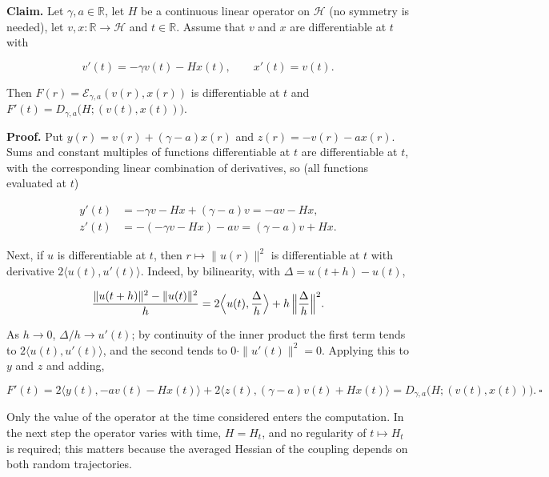 \documentclass[11pt,a4paper]{article}
\begin{document}
\textbf{Claim.} Let \(\gamma,a\in\mathbb R\), let \(H\) be a continuous linear operator on \(\mathcal H\) (no symmetry is needed), let \(v,x:\mathbb R\to\mathcal H\) and \(t\in\mathbb R\). Assume that \(v\) and \(x\) are differentiable at \(t\) with


\[v'(t)=-\gamma v(t)-Hx(t),\qquad x'(t)=v(t).\]


Then \(F(r)=\mathcal E_{\gamma,a}(v(r),x(r))\) is differentiable at \(t\) and \(F'(t)=D_{\gamma,a}\bigl(H;(v(t),x(t))\bigr)\).




\textbf{Proof.} Put \(y(r)=v(r)+(\gamma-a)x(r)\) and \(z(r)=-v(r)-ax(r)\). Sums and constant multiples of functions differentiable at \(t\) are differentiable at \(t\), with the corresponding linear combination of derivatives, so (all functions evaluated at \(t\))


\[\begin{aligned}
y'(t)&=-\gamma v-Hx+(\gamma-a)v=-av-Hx,\\
z'(t)&=-(-\gamma v-Hx)-av=(\gamma-a)v+Hx .
\end{aligned}\]


Next, if \(u\) is differentiable at \(t\), then \(r\mapsto\|u(r)\|^2\) is differentiable at \(t\) with derivative \(2\langle u(t),u'(t)\rangle\). Indeed, by bilinearity, with \(\Delta=u(t+h)-u(t)\),


\[\frac{\|u(t+h)\|^2-\|u(t)\|^2}{h}=2\Bigl\langle u(t),\frac{\Delta}{h}\Bigr\rangle+h\,\Bigl\|\frac{\Delta}{h}\Bigr\|^2 .\]


As \(h\to0\), \(\Delta/h\to u'(t)\); by continuity of the inner product the first term tends to \(2\langle u(t),u'(t)\rangle\), and the second tends to \(0\cdot\|u'(t)\|^2=0\). Applying this to \(y\) and \(z\) and adding,


\[F'(t)=2\langle y(t),-av(t)-Hx(t)\rangle+2\langle z(t),(\gamma-a)v(t)+Hx(t)\rangle=D_{\gamma,a}\bigl(H;(v(t),x(t))\bigr).\ \square\]


Only the value of the operator at the time considered enters the computation. In the next step the operator varies with time, \(H=H_t\), and no regularity of \(t\mapsto H_t\) is required; this matters because the averaged Hessian of the coupling depends on both random trajectories.
\end{document}
